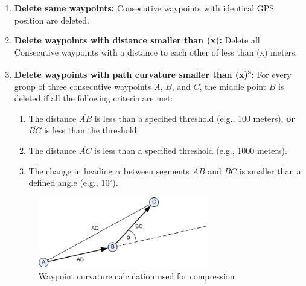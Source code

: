 \documentclass[a4paper,12pt,twoside]{scrreprt}
\begin{document}
\begin{enumerate}
  \item \textbf{Delete same waypoints:} Consecutive waypoints with identical
        GPS position are deleted.
  \item \textbf{Delete waypoints with distance smaller than (x):} Delete all
        Consecutive waypoints with a distance to each other of less than (x)
        meters.
  \item \textbf{Delete waypoints with path curvature smaller than
          (x)\textsuperscript{s}:} For every group of three consecutive
        waypoints \( A \), \( B \), and \( C \), the middle point \( B \) is
        deleted if
        all the following criteria are met:
        \begin{enumerate}
          \item The distance \( \overline{AB} \) is less than a specified
                threshold (e.g., 100 meters), \textbf{or} \( \overline{BC} \)
                is less than the
                threshold.
          \item The distance \( \overline{AC} \) is less than a specified
                threshold (e.g., 1000 meters).
          \item The change in heading \( \alpha \) between segments \(
                \overline{AB} \) and \( \overline{BC} \) is smaller than a
                defined angle (e.g.,
                \(10^\circ\)).
        \end{enumerate}
        \begin{figure}[H]
          \centering
          \vspace{-1em}

          \includegraphics[width=0.7\textwidth]{Figures/problem_definition/Aufzeichnune-komprimieren-winkelreduktion.png}
          \caption{Waypoint curvature calculation used for
            compression~\cite{noauthor_route_nodate}}
          \label{fig:waypoint_curvature_calculation}
          \vspace{-1em}
        \end{figure}
        \FloatBarrier

\end{enumerate}
\end{document}
